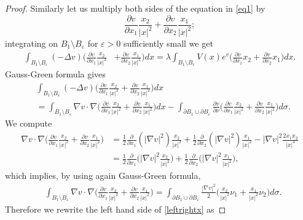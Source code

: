 \documentclass[reqno,11pt]{amsart}
\theoremstyle{definition}
\numberwithin{equation}{section}
\newcommand{\la}{\lambda}
\newcommand{\e}{\varepsilon}
\renewcommand{\(}{\left(}
\renewcommand{\)}{\right)}
\renewcommand{\[}{\left[}
\renewcommand{\]}{\right]}
\newcommand{\beq}{\begin{equation}}
\newcommand{\eeq}{\end{equation}}
\begin{document}
{\begin{proof}
Similarly let us multiply  both sides of the equation in \eqref{eq1} by $$\frac{\partial v}{\partial x_1}\frac{x_2}{|x|^2}+\frac{\partial v}{\partial x_2}\frac{x_1}{|x|^2};$$ integrating on $B_1\setminus B_\e$ for $\e>0$ sufficiently small we get 
\beq\label{leftrightx}\begin{aligned}\int_{B_1\setminus B_\e} (-\Delta v)\bigg(\frac{\partial v}{\partial x_1}\frac{x_2}{|x|^2}&+\frac{\partial v}{\partial x_2}\frac{x_1}{|x|^2}\bigg)dx=\la \int_{B_1\setminus B_\e}V(x) e^{v}\bigg(\frac{\partial v}{\partial x_1}x_2+\frac{\partial v}{\partial x_2}x_1\bigg)dx.\end{aligned}\eeq
Gauss-Green formula gives 
$$\begin{aligned}&\int_{B_1\setminus B_\e} (-\Delta v)\bigg(\frac{\partial v}{\partial x_1}\frac{x_2}{|x|^2}+\frac{\partial v}{\partial x_2}\frac{x_1}{|x|^2}\bigg)dx\\ &=
\int_{B_1\setminus B_\e} \nabla v\cdot \nabla\bigg(\frac{\partial v}{\partial x_1}\frac{x_2}{|x|^2}+\frac{\partial v}{\partial x_2}\frac{x_1}{|x|^2}\bigg)dx-\int_{\partial B_1\cup\partial B_\e }\frac{\partial v}{\partial \nu}\bigg(\frac{\partial v}{\partial x_1}\frac{x_2}{|x|^2}+\frac{\partial v}{\partial x_2}\frac{x_1}{|x|^2}\bigg)d\sigma .
\end{aligned} $$
We compute
$$\begin{aligned}\nabla v\cdot \nabla \bigg(\frac{\partial v}{\partial x_1}\frac{x_2}{|x|^2}+\frac{\partial v}{\partial x_2}\frac{x_1}{|x|^2}\bigg) &=
\frac12\frac{\partial }{\partial x_1}(|\nabla v|^2)\frac{x_2}{|x|^2}+\frac12\frac{\partial }{\partial x_2}(|\nabla v|^2)\frac{x_1}{|x|^2}-|\nabla v|^2 \frac{2x_1x_2}{|x|^{4}}
\\ &=\frac12\frac{\partial}{\partial x_1}\bigg(|\nabla v|^2 \frac{x_2}{|x|^2}\bigg)+\frac12 \frac{\partial}{\partial x_2}\bigg(|\nabla v|^2 \frac{x_1}{|x|^2}\bigg),
\end{aligned}$$
which implies, by using  again Gauss-Green formula,
$$\begin{aligned}&\int_{B_1\setminus B_\e} \nabla v\cdot \nabla \bigg(\frac{\partial v}{\partial x_1}\frac{x_2}{|x|^2}+\frac{\partial v}{\partial x_2}\frac{x_1}{|x|^2}\bigg)
 = \int_{\partial B_1\cup\partial B_\e} \frac{|\nabla v|^2 }{2}\bigg(\frac{x_2}{|x|^2}\nu_1+\frac{x_1}{|x|^2}\nu_2\bigg) d\sigma
.
\end{aligned}$$
Therefore we rewrite the left hand side of \eqref{leftrightx} as


\end{proof}}
\end{document}
